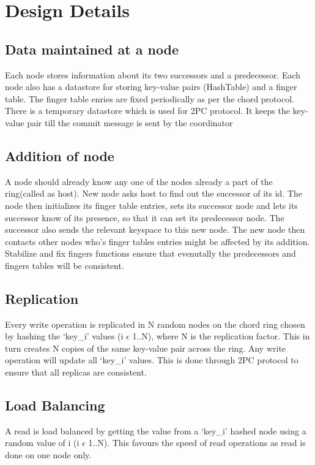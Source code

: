 \documentclass{article}
\begin{document}
\section{Design Details}
\subsection{Data maintained at a node}
Each node stores information about its two successors and a  predecessor. Each node also has a datastore for storing key-value pairs (HashTable) and a finger table. The finger table enries are fixed periodically as per the chord protocol.  There is a temporary datastore which is used for 2PC protocol. It keeps the key-value pair till the commit message is sent by the coordinator \\

\subsection{Addition of node}
A node should already know any one of the nodes already a part of the ring(called as host). New node asks host to find out the successor of its id. The node then initializes its finger table entries, sets its successor node and lets its successor know of its presence, so that it can set its predecessor node. The successor also sends the relevant keyspace to this new node. The new node then contacts other nodes who's finger tables entries might be affected by its addition. 
Stabilize and fix fingers functions ensure that evenutally the predecessors and fingers tables will be consistent.

\subsection{Replication}
Every write operation is replicated in N random nodes on the chord ring chosen by hashing the `key\_i' values (i $\epsilon$ 1..N), where N is the replication factor. This in turn creates N copies of the same key-value pair across the ring.
Any write operation will update all `key\_i' values. This is done through 2PC protocol to ensure that all replicas are consistent.

\subsection{Load Balancing}
A read is load balanced by getting the value from a `key\_i' hashed node using a random value of i (i $\epsilon$ 1..N). This favours the speed of read operations as read is done on one node only.
\end{document}
